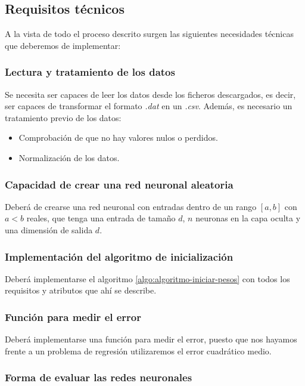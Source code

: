 \subsection{Requisitos técnicos}  

A la vista de todo el proceso descrito surgen las siguientes necesidades técnicas que deberemos de implementar:  

\subsubsection{Lectura y tratamiento de los datos}

Se necesita ser capaces de leer los datos desde los ficheros descargados, es decir, ser capaces de transformar el formato \textit{.dat} en un \textit{.csv}. 
Además, es necesario un tratamiento previo de los datos: 
\begin{itemize}
    \item Comprobación de que no hay valores nulos o perdidos. 
    \item Normalización de los datos. 
\end{itemize}


\subsubsection{Capacidad de crear una red neuronal aleatoria}  

Deberá de crearse una red neuronal con entradas dentro de un rango $[a,b]$ con $a < b$ reales,
que tenga una entrada de tamaño $d$,
$n$ neuronas en la capa oculta y
una dimensión de salida $d$.

\subsubsection{Implementación del algoritmo de inicialización}

Deberá implementarse el algoritmo  \ref{algo:algoritmo-iniciar-pesos} con todos los requisitos y atributos que ahí se describe.  

\subsubsection{Función para medir el error}

Deberá implementarse una función para medir el
 error, puesto que nos hayamos frente a un problema de regresión utilizaremos el error cuadrático medio. 

\subsubsection{Forma de evaluar las redes neuronales}  

